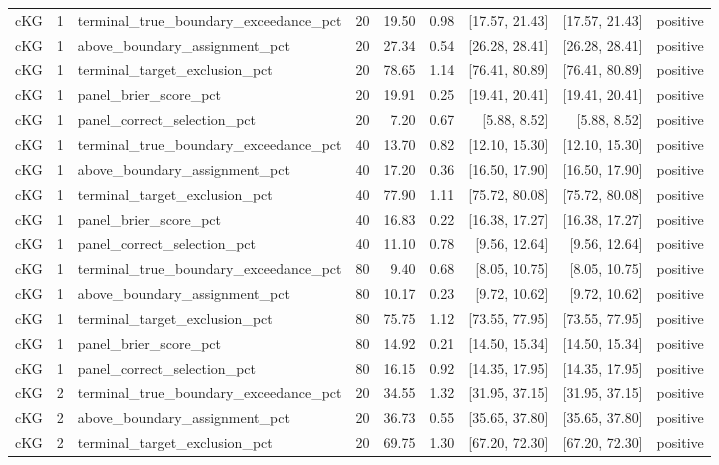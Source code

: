 \begin{longtable}{lllrrrrrl}
cKG & 1 & terminal\_true\_boundary\_exceedance\_pct & 20 & 19.50 & 0.98 & [17.57, 21.43] & [17.57, 21.43] & positive \\
cKG & 1 & above\_boundary\_assignment\_pct & 20 & 27.34 & 0.54 & [26.28, 28.41] & [26.28, 28.41] & positive \\
cKG & 1 & terminal\_target\_exclusion\_pct & 20 & 78.65 & 1.14 & [76.41, 80.89] & [76.41, 80.89] & positive \\
cKG & 1 & panel\_brier\_score\_pct & 20 & 19.91 & 0.25 & [19.41, 20.41] & [19.41, 20.41] & positive \\
cKG & 1 & panel\_correct\_selection\_pct & 20 & 7.20 & 0.67 & [5.88, 8.52] & [5.88, 8.52] & positive \\
cKG & 1 & terminal\_true\_boundary\_exceedance\_pct & 40 & 13.70 & 0.82 & [12.10, 15.30] & [12.10, 15.30] & positive \\
cKG & 1 & above\_boundary\_assignment\_pct & 40 & 17.20 & 0.36 & [16.50, 17.90] & [16.50, 17.90] & positive \\
cKG & 1 & terminal\_target\_exclusion\_pct & 40 & 77.90 & 1.11 & [75.72, 80.08] & [75.72, 80.08] & positive \\
cKG & 1 & panel\_brier\_score\_pct & 40 & 16.83 & 0.22 & [16.38, 17.27] & [16.38, 17.27] & positive \\
cKG & 1 & panel\_correct\_selection\_pct & 40 & 11.10 & 0.78 & [9.56, 12.64] & [9.56, 12.64] & positive \\
cKG & 1 & terminal\_true\_boundary\_exceedance\_pct & 80 & 9.40 & 0.68 & [8.05, 10.75] & [8.05, 10.75] & positive \\
cKG & 1 & above\_boundary\_assignment\_pct & 80 & 10.17 & 0.23 & [9.72, 10.62] & [9.72, 10.62] & positive \\
cKG & 1 & terminal\_target\_exclusion\_pct & 80 & 75.75 & 1.12 & [73.55, 77.95] & [73.55, 77.95] & positive \\
cKG & 1 & panel\_brier\_score\_pct & 80 & 14.92 & 0.21 & [14.50, 15.34] & [14.50, 15.34] & positive \\
cKG & 1 & panel\_correct\_selection\_pct & 80 & 16.15 & 0.92 & [14.35, 17.95] & [14.35, 17.95] & positive \\
cKG & 2 & terminal\_true\_boundary\_exceedance\_pct & 20 & 34.55 & 1.32 & [31.95, 37.15] & [31.95, 37.15] & positive \\
cKG & 2 & above\_boundary\_assignment\_pct & 20 & 36.73 & 0.55 & [35.65, 37.80] & [35.65, 37.80] & positive \\
cKG & 2 & terminal\_target\_exclusion\_pct & 20 & 69.75 & 1.30 & [67.20, 72.30] & [67.20, 72.30] & positive \\

\end{longtable}
